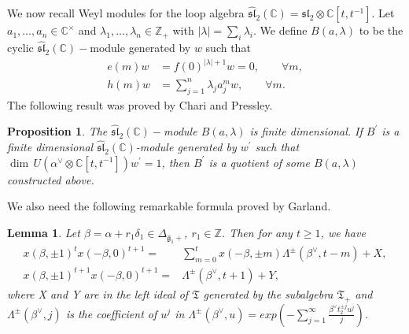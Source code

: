 \documentclass[11pt]{amsproc}
\newtheorem{lemma}[theorem]{Lemma}
\newtheorem{proposition}{Proposition}[section]
\theoremstyle{definition}
\theoremstyle{remark}
\numberwithin{equation}{section} \errorcontextlines=0
\begin{document}
We now recall Weyl modules \cite{CP} for the loop algebra
$\hat{\mathfrak{sl}}_2(\mathbb{C})=\mathfrak{sl_2}\otimes\mathbb{C}[t,t^{-1}]$.
Let $a_1, \ldots,a_n \in\mathbb C^{\times}$ and
${\lambda}_1, \ldots,{\lambda}_n\in\mathbb Z_+$ with $|{\lambda}|=\sum_i{\lambda}_i$. We define $B(a, {\lambda})$ to be
the cyclic $\hat{\mathfrak{sl}}_2(\mathbb{C})-$module generated by $w$ such that
\begin{align*}
e(m)w&=f(0)^{|{\lambda}|+1}w=0, \qquad \forall m,\\
h(m)w&=\sum\limits_{j=1}^n {\lambda}_j a_j^mw, \qquad \forall m .
\end{align*}
The following result was proved by Chari and Pressley.
\begin{proposition}\cite{CP}\label{8} The $\hat{\mathfrak{sl}}_2(\mathbb{C})-$module
$B(a, {\lambda})$ is finite dimensional. If $B^{'}$ is a finite dimensional
$\hat{\mathfrak{sl}}_2(\mathbb{C})$-module generated by
$w^{'}$ such that $\dim\,
U(\alpha^{\vee}\otimes\mathbb{C}[t,t^{-1}])w^{'}=1$, then $B^{'}$
is a quotient of some $B(a, {\lambda})$ constructed above.
\end{proposition}

We also need the following remarkable formula
proved by Garland.
\begin{lemma}\cite{G} \label{14} Let
$\beta=\alpha+r_1\delta_1\in{\Delta_{\hat{\mathfrak g}_1+}}$, $r_1\in\mathbb{Z}$. Then for any $t\geq1$,
we have
\begin{equation*}
\begin{split}
x(\beta,\pm1)^t x(-\beta,0)^{t+1}=&\sum \limits_{m=0}^t x(-\beta,\pm m)\Lambda^{\pm}(\beta^{\vee},t-m)+X,\\
x(\beta,\pm1)^{t+1}x(-\beta,0)^{t+1}=&\Lambda^{\pm}(\beta^{\vee},t+1)+Y,
\end{split}
\end{equation*}
where X and Y are in the left ideal of $\mathfrak T$ generated by
the subalgebra $\mathfrak T_+$ and $\Lambda^{\pm}(\beta^{\vee},j)$ is the coefficient of $u^{j}$ in
$\Lambda^{\pm}(\beta^{\vee},u)=exp(-\sum\limits_{j=1}^{\infty}\frac{\beta^{\vee}t_2^{\pm
j} u^{j}}{j})$.
\end{lemma}
\end{document}
